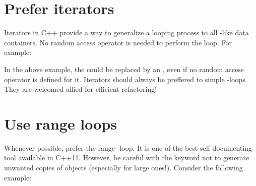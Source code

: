 %
%

%
%
%
%

\section{Prefer iterators}
Iterators in C++ provide a way to generalize a looping process to all 
-like data containers. No random access operator is needed to perform 
the loop. For example:


In the above example, the  could be replaced by an 
, even if no random access operator is defined for it. Iterators 
should always be preffered to simple -loops. They are welcomed allied 
for efficient refactoring!

\section{Use range  loops}
Whenever possible, prefer the range--loop. It is one of the best self 
documenting tool available in C++11. However, be careful with the keyword 
 not to generate unwanted copies of objects (especially for large 
ones!). Consider the following example:

